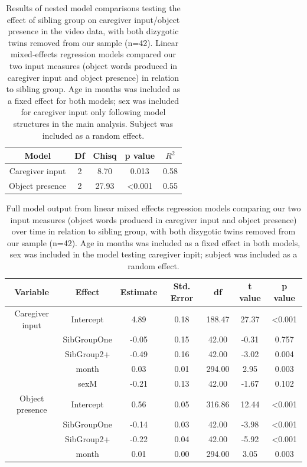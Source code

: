 \documentclass[
  man,mask,floatsintext]{apa6}
\begin{document}
\begin{longtable}[t]{ccccc}
\caption{\label{tab:table-model-comparisons-no-twins}Results of nested model comparisons testing the effect of sibling group on caregiver input/object presence in the video data, with both dizygotic twins removed from our sample (n=42). Linear mixed-effects regression models compared our two input measures (object words produced in caregiver input  and object presence) in relation to sibling group. Age in months was included as a fixed effect for both models; sex was included for caregiver input only following model structures in the main analysis. Subject was included as a random effect.}\\
\toprule
Model & Df & Chisq & p value & $R^{2}$\\
\midrule
Caregiver input & 2 & 8.70 & 0.013 & 0.58\\
Object presence & 2 & 27.93 & <0.001 & 0.55\\
\bottomrule
\end{longtable}

\begin{longtable}[t]{ccccccc}
\caption{\label{tab:table-input-model-summary-no-twins}Full model output from linear mixed effects regression models comparing our two input measures (object words produced in caregiver input and object presence) over time in relation to sibling group, with both dizygotic twins removed from our sample (n=42). Age in months was included as a fixed effect in both models, sex was included in the model testing caregiver inpit; subject was included as a random effect.}\\
\toprule
Variable & Effect & Estimate & Std. Error & df & t value & p value\\
\midrule
Caregiver input & Intercept & 4.89 & 0.18 & 188.47 & 27.37 & <0.001\\
 & SibGroupOne & -0.05 & 0.15 & 42.00 & -0.31 & 0.757\\
 & SibGroup2+ & -0.49 & 0.16 & 42.00 & -3.02 & 0.004\\
 & month & 0.03 & 0.01 & 294.00 & 2.95 & 0.003\\
 & sexM & -0.21 & 0.13 & 42.00 & -1.67 & 0.102\\
\midrule
\addlinespace
Object presence & Intercept & 0.56 & 0.05 & 316.86 & 12.44 & <0.001\\
 & SibGroupOne & -0.14 & 0.03 & 42.00 & -3.98 & <0.001\\
 & SibGroup2+ & -0.22 & 0.04 & 42.00 & -5.92 & <0.001\\
 & month & 0.01 & 0.00 & 294.00 & 3.05 & 0.003\\
\bottomrule
\end{longtable}
\end{document}
